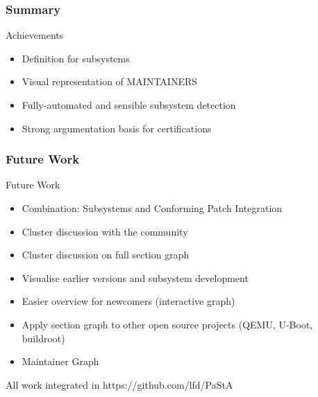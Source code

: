 \documentclass{beamer}
\begin{document}
	\begin{frame}
	\frametitle{Summary}
		\begin{block}{Achievements}
			\begin{itemize}
				\item Definition for subsystems
				\item Visual representation of MAINTAINERS
				\item Fully-automated and sensible subsystem detection
				\item Strong argumentation basis for certifications
			\end{itemize}
		\end{block}
	\end{frame}

	\begin{frame}
	\frametitle{Future Work}
		\begin{block}{Future Work}
			\begin{itemize}
				\item Combination: Subsystems and Conforming Patch Integration
				\item Cluster discussion with the community
				\item Cluster discussion on full section graph
				\item Visualise earlier versions and subsystem development
				\item Easier overview for newcomers (interactive graph)
				\item Apply section graph to other open source projects (QEMU, U-Boot, buildroot)
				\item Maintainer Graph
			\end{itemize}
		\end{block}

		All work integrated in https://github.com/lfd/PaStA
	\end{frame}
\end{document}

